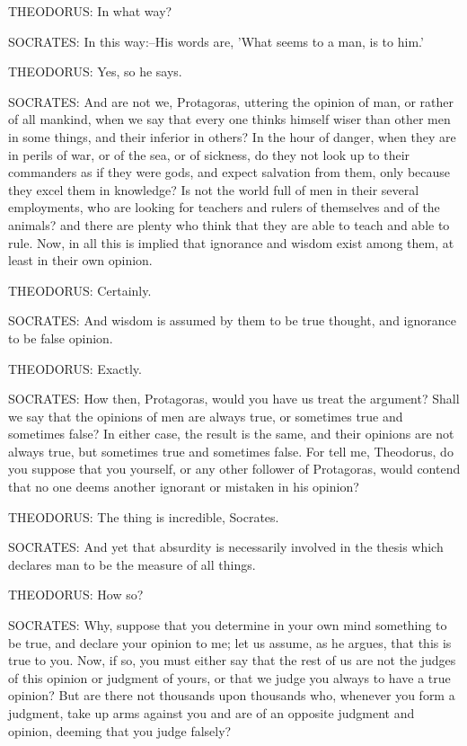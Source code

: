 THEODORUS: In what way?

SOCRATES: In this way:--His words are, 'What seems to a man, is to him.'

THEODORUS: Yes, so he says.

SOCRATES: And are not we, Protagoras, uttering the opinion of man, or
rather of all mankind, when we say that every one thinks himself wiser
than other men in some things, and their inferior in others? In the
hour of danger, when they are in perils of war, or of the sea, or of
sickness, do they not look up to their commanders as if they were
gods, and expect salvation from them, only because they excel them in
knowledge? Is not the world full of men in their several employments,
who are looking for teachers and rulers of themselves and of the
animals? and there are plenty who think that they are able to teach
and able to rule. Now, in all this is implied that ignorance and wisdom
exist among them, at least in their own opinion.

THEODORUS: Certainly.

SOCRATES: And wisdom is assumed by them to be true thought, and
ignorance to be false opinion.

THEODORUS: Exactly.

SOCRATES: How then, Protagoras, would you have us treat the argument?
Shall we say that the opinions of men are always true, or sometimes true
and sometimes false? In either case, the result is the same, and their
opinions are not always true, but sometimes true and sometimes false.
For tell me, Theodorus, do you suppose that you yourself, or any other
follower of Protagoras, would contend that no one deems another ignorant
or mistaken in his opinion?

THEODORUS: The thing is incredible, Socrates.

SOCRATES: And yet that absurdity is necessarily involved in the thesis
which declares man to be the measure of all things.

THEODORUS: How so?

SOCRATES: Why, suppose that you determine in your own mind something to
be true, and declare your opinion to me; let us assume, as he argues,
that this is true to you. Now, if so, you must either say that the rest
of us are not the judges of this opinion or judgment of yours, or that
we judge you always to have a true opinion? But are there not thousands
upon thousands who, whenever you form a judgment, take up arms against
you and are of an opposite judgment and opinion, deeming that you judge
falsely?


